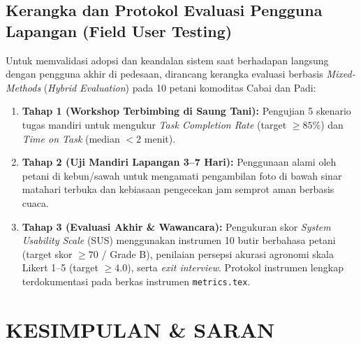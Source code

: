 \documentclass[11pt,a4paper]{article}
\begin{document}
\subsection{Kerangka dan Protokol Evaluasi Pengguna Lapangan (Field User Testing)}
Untuk memvalidasi adopsi dan keandalan sistem saat berhadapan langsung dengan pengguna akhir di pedesaan, dirancang kerangka evaluasi berbasis \textit{Mixed-Methods} (\textit{Hybrid Evaluation}) pada 10 petani komoditas Cabai dan Padi:
\begin{enumerate}
    \item \textbf{Tahap 1 (Workshop Terbimbing di Saung Tani):} Pengujian 5 skenario tugas mandiri untuk mengukur \textit{Task Completion Rate} (target $\ge 85\%$) dan \textit{Time on Task} (median $< 2$ menit).
    \item \textbf{Tahap 2 (Uji Mandiri Lapangan 3--7 Hari):} Penggunaan alami oleh petani di kebun/sawah untuk mengamati pengambilan foto di bawah sinar matahari terbuka dan kebiasaan pengecekan jam semprot aman berbasis cuaca.
    \item \textbf{Tahap 3 (Evaluasi Akhir \& Wawancara):} Pengukuran skor \textit{System Usability Scale} (SUS) menggunakan instrumen 10 butir berbahasa petani (target skor $\ge 70$ / Grade B), penilaian persepsi akurasi agronomi skala Likert 1--5 (target $\ge 4.0$), serta \textit{exit interview}. Protokol instrumen lengkap terdokumentasi pada berkas instrumen \texttt{metrics.tex}.
\end{enumerate}

\section{KESIMPULAN \& SARAN}
\end{document}
